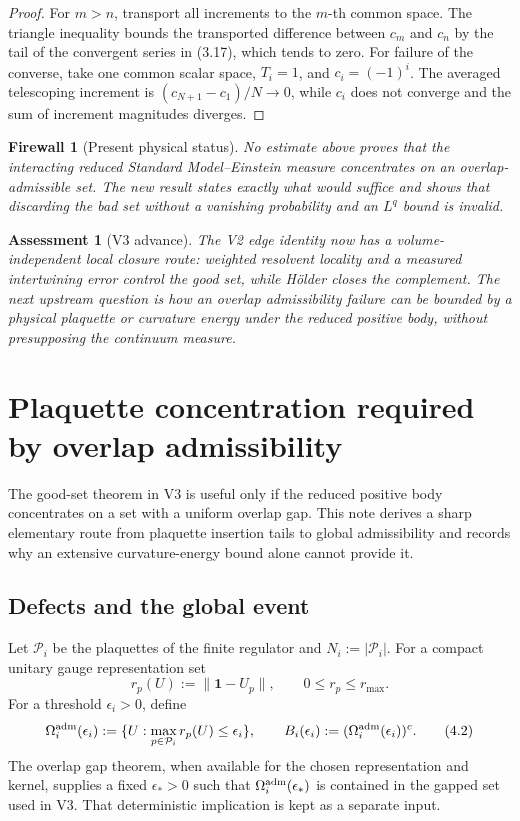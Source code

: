\documentclass[11pt]{article}
\newtheorem{assessment}[theorem]{Assessment}
\newtheorem{firewall}[theorem]{Firewall}
\begin{document}
\begin{proof}
For \(m>n\), transport all increments to the \(m\)-th common space.
The triangle inequality bounds the transported difference between
\(c_m\) and \(c_n\) by the tail of the convergent series in (3.17), which
tends to zero.  For failure of the converse, take one common scalar space,
\(T_i=1\), and \(c_i=(-1)^i\).  The averaged telescoping increment is
\((c_{N+1}-c_1)/N\to0\), while \(c_i\) does not converge and the sum of
increment magnitudes diverges.
\end{proof}

\begin{firewall}[Present physical status]
\label{fw:v11v3-status}
No estimate above proves that the interacting reduced
Standard Model--Einstein measure concentrates on an overlap-admissible
set.  The new result states exactly what would suffice and shows that
discarding the bad set without a vanishing probability and an \(L^q\)
bound is invalid.
\end{firewall}

\begin{assessment}[V3 advance]
\label{ass:v11v3}
The V2 edge identity now has a volume-independent local closure route:
weighted resolvent locality and a measured intertwining error control the
good set, while H\"older closes the complement.  The next upstream
question is how an overlap admissibility failure can be bounded by a
physical plaquette or curvature energy under the reduced positive body,
without presupposing the continuum measure.
\end{assessment}


\section{Plaquette concentration required by overlap admissibility}
\label{sec:v11v4}

The good-set theorem in V3 is useful only if the reduced positive body
concentrates on a set with a uniform overlap gap.  This note derives a
sharp elementary route from plaquette insertion tails to global
admissibility and records why an extensive curvature-energy bound alone
cannot provide it.

\subsection{Defects and the global event}

Let \(\mathcal P_i\) be the plaquettes of the finite regulator and
\(N_i:=|\mathcal P_i|\).  For a compact unitary gauge representation set
\[
 r_p(U):=\|\mathbf 1-U_p\|,\qquad 0\leq r_p\leq r_{\max}.
 \tag{4.1}
\]
For a threshold \(\epsilon_i>0\), define
\[
 \Omega_i^{\rm adm}(\epsilon_i)
 :=
 \{U:\max_{p\in\mathcal P_i}r_p(U)\leq\epsilon_i\},
 \qquad
 B_i(\epsilon_i):=(\Omega_i^{\rm adm}(\epsilon_i))^c.
 \tag{4.2}
\]
The overlap gap theorem, when available for the chosen representation and
kernel, supplies a fixed \(\epsilon_*>0\) such that
\(\Omega_i^{\rm adm}(\epsilon_*)\) is contained in the gapped set used in
V3.  That deterministic implication is kept as a separate input.
\end{document}
